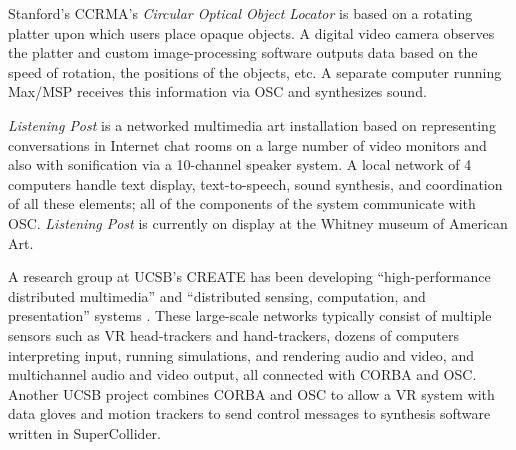 Stanford's CCRMA's \textit{Circular Optical Object Locator} \cite{Hankins:2002} is based on a
rotating platter upon which users place opaque objects.  A digital video camera
observes the platter and custom image-processing software outputs data based on
the speed of rotation, the positions of the objects, etc.  A separate computer
running Max/MSP receives this information via OSC and synthesizes sound.

\textit{Listening Post} \cite{Hansen:2002} is a networked multimedia art installation based on
representing conversations in Internet chat rooms on a large number of video
monitors and also with sonification via a 10-channel speaker system.  A local
network of 4 computers handle text display, text-to-speech, sound synthesis, and
coordination of all these elements; all of the components of the system
communicate with OSC.  \textit{Listening Post} is currently on display at the
Whitney museum of American Art.

A research group at UCSB's CREATE has been developing ``high-performance
distributed multimedia'' and ``distributed sensing, computation, and
presentation'' systems \cite{Pope:2002}.  These large-scale networks typically consist of
multiple sensors such as VR head-trackers and hand-trackers, dozens of computers
interpreting input, running simulations, and rendering audio and video, and
multichannel audio and video output, all connected with CORBA and OSC.  Another
UCSB project \cite{Durand:2002} combines CORBA and OSC  to allow a VR system with data gloves
and motion trackers to send control messages to synthesis software written in
SuperCollider.


